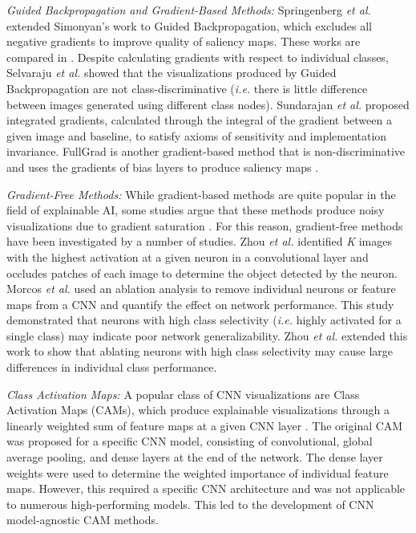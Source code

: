 \documentclass[10pt, conference, compsocconf]{IEEEtran}
\begin{document}
\textit{Guided Backpropagation and Gradient-Based Methods:} Springenberg \textit{et al.} \cite{springenberg2014striving} extended Simonyan’s work to Guided Backpropagation, which excludes all negative gradients to improve quality of saliency maps. These works are compared in \cite{mahendran2016salient}. Despite calculating gradients with respect to individual classes, Selvaraju \textit{et al.} showed that the visualizations produced by Guided Backpropagation are not class-discriminative (\textit{i.e.} there is little difference between images generated using different class nodes)\cite{gradcam}. Sundarajan \textit{et al.} \cite{sundararajan2017axiomatic} proposed integrated gradients, calculated through the integral of the gradient between a given image and baseline, to satisfy axioms of sensitivity and implementation invariance. FullGrad is another gradient-based method that is non-discriminative and uses the gradients of bias layers to produce saliency maps \cite{Srinivas19}.  

\textit{Gradient-Free Methods:} While gradient-based methods are quite popular in the field of explainable AI, some studies argue that these methods produce noisy visualizations due to gradient saturation \cite{adebayo2018sanity, kindermans2019reliability}. For this reason, gradient-free methods have been investigated by a number of studies. Zhou \textit{et al.} \cite{zhou2014object} identified \textit{K} images with the highest activation at a given neuron in a convolutional layer and occludes patches of each image to determine the object detected by the neuron. Morcos \textit{et al.} \cite{morcos2018importance} used an ablation analysis to remove individual neurons or feature maps from a CNN and quantify the effect on network performance. This study demonstrated that neurons with high class selectivity (\textit{i.e.} highly activated for a single class) may indicate poor network generalizability. Zhou \textit{et al.} \cite{zhou2018revisiting} extended this work to show that ablating neurons with high class selectivity may cause large differences in individual class performance. 

\textit{Class Activation Maps:} A popular class of CNN visualizations are Class Activation Maps (CAMs), which produce explainable visualizations through a linearly weighted sum of feature maps at a given CNN layer \cite{zhou16}. The original CAM was proposed for a specific CNN model, consisting of convolutional, global average pooling, and dense layers at the end of the network. The dense layer weights were used to determine the weighted importance of individual feature maps. However, this required a specific CNN architecture and was not applicable to numerous high-performing models. This led to the development of CNN model-agnostic CAM methods.  
\end{document}
